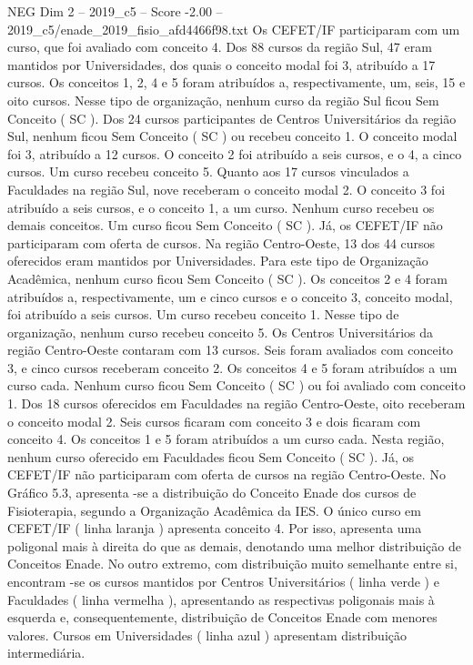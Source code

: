 \begin{textsample}{NEG Dim 2 – 2019\_c5 – Score -2.00 – 2019\_c5/enade\_2019\_fisio\_afd4466f98.txt}
Os CEFET/IF participaram com um curso, que foi avaliado com conceito 4.
Dos 88 cursos da região Sul, 47 eram mantidos por Universidades, dos quais o conceito modal foi 3, atribuído a 17 cursos.
Os conceitos 1, 2, 4 e 5 foram atribuídos a, respectivamente, um, seis, 15 e oito cursos.
Nesse tipo de organização, nenhum curso da região Sul ficou Sem Conceito ( SC ).
Dos 24 cursos participantes de Centros Universitários da região Sul, nenhum ficou Sem Conceito ( SC ) ou recebeu conceito 1.
O conceito modal foi 3, atribuído a 12 cursos.
O conceito 2 foi atribuído a seis cursos, e o 4, a cinco cursos.
Um curso recebeu conceito 5.
Quanto aos 17 cursos vinculados a Faculdades na região Sul, nove receberam o conceito modal 2.
O conceito 3 foi atribuído a seis cursos, e o conceito 1, a um curso.
Nenhum curso recebeu os demais conceitos.
Um curso ficou Sem Conceito ( SC ).
Já, os CEFET/IF não participaram com oferta de cursos.
Na região Centro-Oeste, 13 dos 44 cursos oferecidos eram mantidos por Universidades.
Para este tipo de Organização Acadêmica, nenhum curso ficou Sem Conceito ( SC ).
Os conceitos 2 e 4 foram atribuídos a, respectivamente, um e cinco cursos e o conceito 3, conceito modal, foi atribuído a seis cursos.
Um curso recebeu conceito 1.
Nesse tipo de organização, nenhum curso recebeu conceito 5.
Os Centros Universitários da região Centro-Oeste contaram com 13 cursos.
Seis foram avaliados com conceito 3, e cinco cursos receberam conceito 2.
Os conceitos 4 e 5 foram atribuídos a um curso cada.
Nenhum curso ficou Sem Conceito ( SC ) ou foi avaliado com conceito 1.
Dos 18 cursos oferecidos em Faculdades na região Centro-Oeste, oito receberam o conceito modal 2.
Seis cursos ficaram com conceito 3 e dois ficaram com conceito 4.
Os conceitos 1 e 5 foram atribuídos a um curso cada.
Nesta região, nenhum curso oferecido em Faculdades ficou Sem Conceito ( SC ).
Já, os CEFET/IF não participaram com oferta de cursos na região Centro-Oeste.
No Gráfico 5.3, apresenta -se a distribuição do Conceito Enade dos cursos de Fisioterapia, segundo a Organização Acadêmica da IES.
O único curso em CEFET/IF ( linha laranja ) apresenta conceito 4.
Por isso, apresenta uma poligonal mais à direita do que as demais, denotando uma melhor distribuição de Conceitos Enade.
No outro extremo, com distribuição muito semelhante entre si, encontram -se os cursos mantidos por Centros Universitários ( linha verde ) e Faculdades ( linha vermelha ), apresentando as respectivas poligonais mais à esquerda e, consequentemente, distribuição de Conceitos Enade com menores valores.
Cursos em Universidades ( linha azul ) apresentam distribuição intermediária.

\end{textsample}
